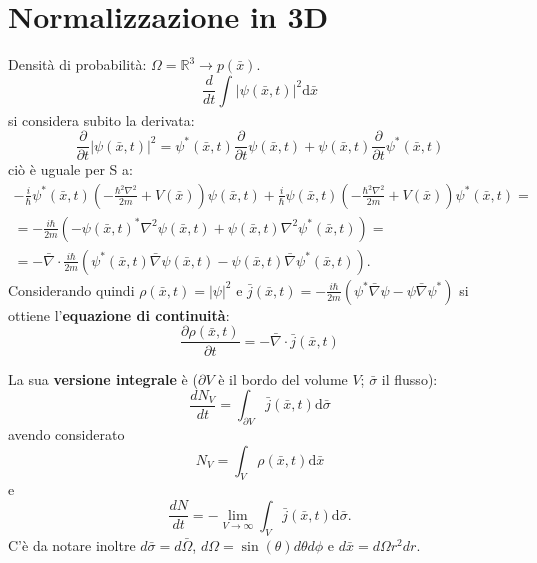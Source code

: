 \section{Normalizzazione in 3D} %
Densità di probabilità: $\Omega=\mathbb{R}^3 \rightarrow p(\bar x)$.
\begin{equation}
\frac{d}{dt}\int_{}^{}{|\psi \left(\bar x,t\right)|^2 \textrm{d}\bar x}
\end{equation}
si considera subito la derivata:
\begin{equation}
\frac{\partial }{\partial t}|\psi \left(\bar x,t\right)|^2=\psi^*\left(\bar x,t\right)\frac{\partial }{\partial t}\psi\left(\bar x,t\right) +\psi \left(\bar x,t\right)\frac{\partial }{\partial t}\psi^*\left(\bar x,t\right)
\end{equation}
ciò è uguale per S a:
\begin{equation}\begin{split}
-\frac{i}{\hbar }\psi ^*\left(\bar x,t\right)\left(-\frac{\hbar ^2\nabla ^2}{2m}+V\left(\bar x\right)\right)\psi \left(\bar x,t\right)+\frac{i}{\hbar }\psi\left(\bar x,t\right) \left(-\frac{\hbar ^2\nabla ^2}{2m}+V\left(\bar x\right)\right)\psi^*\left(\bar x,t\right)=\\
=-\frac{i\hbar }{2m}\left(-\psi\left(\bar x,t\right) ^*\nabla ^2\psi\left(\bar x,t\right) +\psi\left(\bar x,t\right) \nabla ^2\psi ^*\left(\bar x,t\right)\right)=\\
=-\bar \nabla \cdot \frac{i\hbar }{2m}\left(\psi ^*\left(\bar x,t\right)\bar \nabla \psi\left(\bar x,t\right) -\psi\left(\bar x,t\right) \bar \nabla \psi ^*\left(\bar x,t\right)\right).
\end{split}\end{equation}
Considerando quindi $\rho \left(\bar x,t\right)=|\psi|^2$ e $\bar j\left(\bar x,t\right)=-\frac{i\hbar }{2m}\left(\psi ^*\bar \nabla \psi -\psi \bar \nabla \psi ^*\right)$ si ottiene l'\textbf{equazione di continuità}:
\begin{equation}
\frac{\partial \rho \left(\bar x,t\right)}{\partial t}=-\bar \nabla \cdot \bar j\left(\bar x,t\right)
\end{equation}

La sua \textbf{versione integrale} è ($\partial V$ è il bordo del volume $V$; $\bar \sigma$ il flusso):
\begin{equation}
\frac{dN_V}{dt}=\int_{\partial V}^{}{\bar j\left(\bar x,t\right) \textrm{d}\bar \sigma }
\end{equation}
avendo considerato \[N_V=\int_{V}^{}{\rho \left(\bar x,t\right) \textrm{d}\bar x}\] e \[\frac{dN}{dt}=-\lim_{V\to \infty}{\int_{V}^{}{\bar j\left(\bar x,t\right) \textrm{d}\bar \sigma }}.\] C'è da notare inoltre $d\bar \sigma =d\bar \Omega $, $d\Omega =\sin{\left(\theta \right)d\theta d\phi }$ e $d\bar x=d\Omega r^2dr$.

